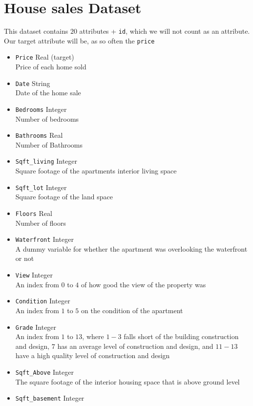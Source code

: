\documentclass[11pt]{article}
\begin{document}
\section{House sales Dataset}
This dataset contains $20$ attributes + \texttt{id}, which we will not count as an attribute. Our target attribute will be, as so often the \texttt{price}
\begin{multicols}{2}
\begin{itemize}
\item \texttt{Price} Real (target) \\
Price of each home sold
\item \texttt{Date} String\\
Date of the home sale 
\item \texttt{Bedrooms} Integer\\
Number of bedrooms
\item \texttt{Bathrooms} Real\\
Number of Bathrooms
\item \texttt{Sqft\_living} Integer\\
Square footage of the apartments interior living space
\item \texttt{Sqft\_lot} Integer\\
Square footage of the land space
\item \texttt{Floors} Real\\
Number of floors
\item \texttt{Waterfront} Integer\\
A dummy variable for whether the apartment was overlooking the waterfront or not
\item \texttt{View} Integer\\
An index from $0$ to $4$ of how good the view of the property was
\item \texttt{Condition} Integer\\
An index from $1$ to $5$ on the condition of the apartment
\columnbreak
\item \texttt{Grade} Integer\\
An index from $1$ to $13$, where $1-3$ falls short of the building construction and design, $7$ has an average level of construction and design, and $11-13$ have a high quality level of construction and design
\item \texttt{Sqft\_Above} Integer\\
The square footage of the interior housing space that is above ground level
\item \texttt{Sqft\_basement} Integer\\

\end{itemize}
\end{multicols}
\end{document}

